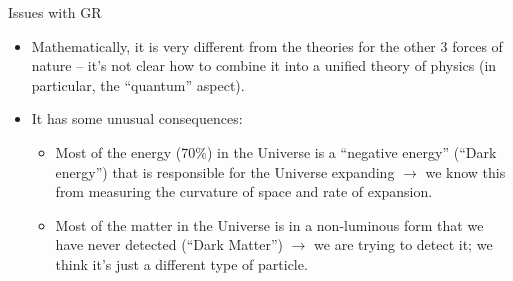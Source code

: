 \documentclass[aspectratio=169,
hyperref={colorlinks,urlcolor=blue}
]{beamer}
\begin{document}
\begin{frame}{Issues with GR}
\begin{itemize}
\item Mathematically, it is very different from the theories for the other 3 forces of nature – it’s not clear how to combine it into a unified theory of physics (in particular, the ``quantum'' aspect).
\item It has some unusual consequences:
\begin{itemize}
\item Most of the energy (70\%) in the Universe is a ``negative energy'' (``Dark energy'') that is responsible for the Universe expanding $\rightarrow$ we know this from measuring the curvature of space and rate of expansion.
\item Most of the matter in the Universe is in a non-luminous form that we have never detected (``Dark Matter'') $\rightarrow$ we are trying to detect it; we think it's just a different type of particle.
\end{itemize}
\end{itemize}
\end{frame}

























\end{document}

